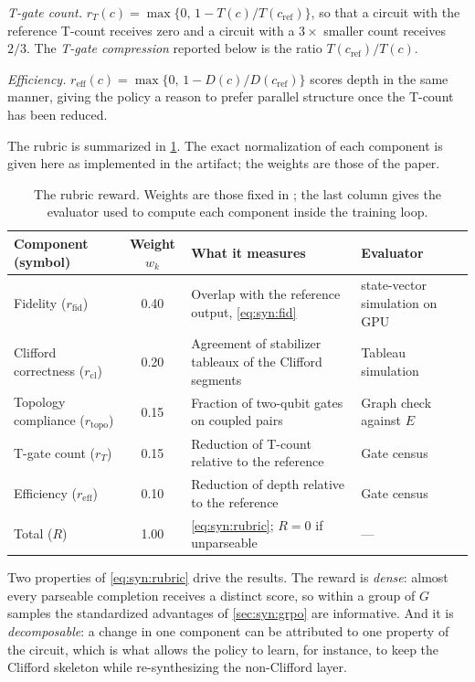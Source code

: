 \emph{T-gate count.} $r_{T}(c)=\max\{0,\,1-T(c)/T(c_{\mathrm{ref}})\}$, so that a circuit with the reference T-count receives zero and a circuit with a $3\times$ smaller count receives $2/3$. The \emph{T-gate compression} reported below is the ratio $T(c_{\mathrm{ref}})/T(c)$.

\emph{Efficiency.} $r_{\mathrm{eff}}(c)=\max\{0,\,1-D(c)/D(c_{\mathrm{ref}})\}$ scores depth in the same manner, giving the policy a reason to prefer parallel structure once the T-count has been reduced.

The rubric is summarized in \cref{tab:syn:rubric}. The exact normalization of each component is given here as implemented in the artifact; the weights are those of the paper.

\begin{table}[htbp]
\caption{The \rubriq{} rubric reward. Weights are those fixed in \cite{guo2026rubriq}; the last column gives the evaluator used to compute each component inside the training loop.}
\label{tab:syn:rubric}
\centering\footnotesize
\begin{tabularx}{\textwidth}{@{}l c X X@{}}
\toprule
Component (symbol) & Weight $w_k$ & What it measures & Evaluator \\
\midrule
Fidelity ($r_{\mathrm{fid}}$) & 0.40 & Overlap with the reference output, \cref{eq:syn:fid} & \cudaq{} state-vector simulation on GPU \\
Clifford correctness ($r_{\mathrm{cl}}$) & 0.20 & Agreement of stabilizer tableaux of the Clifford segments & Tableau simulation~\cite{aaronson2004stabilizer} \\
Topology compliance ($r_{\mathrm{topo}}$) & 0.15 & Fraction of two-qubit gates on coupled pairs & Graph check against $E$ \\
T-gate count ($r_{T}$) & 0.15 & Reduction of T-count relative to the reference & Gate census \\
Efficiency ($r_{\mathrm{eff}}$) & 0.10 & Reduction of depth relative to the reference & Gate census \\
\midrule
Total ($R$) & 1.00 & \cref{eq:syn:rubric}; $R=0$ if unparseable & --- \\
\bottomrule
\end{tabularx}
\end{table}

Two properties of \cref{eq:syn:rubric} drive the results. The reward is \emph{dense}: almost every parseable completion receives a distinct score, so within a group of $G$ samples the standardized advantages of \cref{sec:syn:grpo} are informative. And it is \emph{decomposable}: a change in one component can be attributed to one property of the circuit, which is what allows the policy to learn, for instance, to keep the Clifford skeleton while re-synthesizing the non-Clifford layer.

